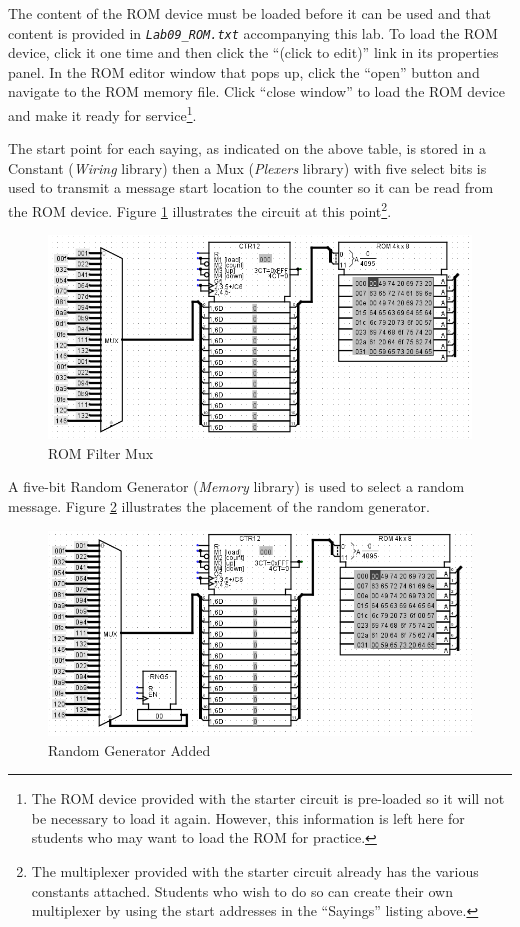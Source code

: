 The content of the ROM device must be loaded before it can be used and that content is provided in \emph{\texttt{Lab09\_ROM.txt}} accompanying this lab. To load the ROM device, click it one time and then click the ``(click to edit)'' link in its properties panel. In the ROM editor window that pops up, click the ``open'' button and navigate to the ROM memory file. Click ``close window'' to load the ROM device and make it ready for service\footnote{The ROM device provided with the starter circuit is pre-loaded so it will not be necessary to load it again. However, this information is left here for students who may want to load the ROM for practice.}.

The start point for each saying, as indicated on the above table, is stored in a Constant (\textit{Wiring} library) then a Mux (\textit{Plexers} library) with five select bits is used to transmit a message start location to the counter so it can be read from the ROM device. Figure \ref{fig:09-04} illustrates the circuit at this point\footnote{The multiplexer provided with the starter circuit already has the various constants attached. Students who wish to do so can create their own multiplexer by using the start addresses in the ``Sayings'' listing above.}.

\begin{figure}[H]
	\centering
	\includegraphics[width=\maxwidth{.95\linewidth}]{gfx/09-04}
	\caption{ROM Filter Mux}
	\label{fig:09-04}
\end{figure}

A five-bit Random Generator (\textit{Memory} library) is used to select a random message. Figure \ref{fig:09-05} illustrates the placement of the random generator.

\begin{figure}[H]
	\centering
	\includegraphics[width=\maxwidth{.95\linewidth}]{gfx/09-05}
	\caption{Random Generator Added}
	\label{fig:09-05}
\end{figure}

